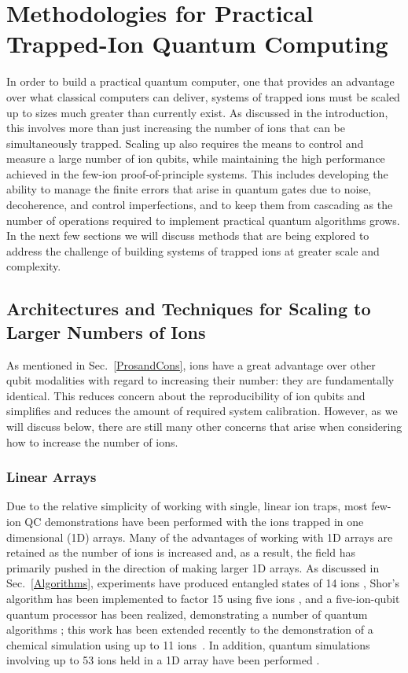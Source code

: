 \documentclass[%
12pt,
 amsmath,amssymb,
]{revtex4-2}
\begin{document}
\section{Methodologies for Practical Trapped-Ion Quantum Computing}
\label{PracticalQC}
In order to build a practical quantum computer, one that provides an advantage over what classical computers can deliver, systems of trapped ions must be scaled up to sizes much greater than currently exist.  As discussed in the introduction, this involves more than just increasing the number of ions that can be simultaneously trapped. Scaling up also requires the means to control and measure a large number of ion qubits, while maintaining the high performance achieved in the few-ion proof-of-principle systems.  This includes developing the ability to manage the finite errors that arise in quantum gates due to noise, decoherence, and control imperfections, and to keep them from cascading as the number of operations required to implement practical quantum algorithms grows.  In the next few sections we will discuss methods that are being explored to address the challenge of building systems of trapped ions at greater scale and complexity.

\subsection{Architectures and Techniques for Scaling to Larger Numbers of Ions}
\label{ScalingMethods}
As mentioned in Sec.~\ref{ProsandCons}, ions have a great advantage over other qubit modalities with regard to increasing their number: they are fundamentally identical.  This reduces concern about the reproducibility of ion qubits and simplifies and reduces the amount of required system calibration.  However, as we will discuss below, there are still many other concerns that arise when considering how to increase the number of ions.
    \subsubsection{Linear Arrays}
    \label{LinearArrays}
Due to the relative simplicity of working with single, linear ion traps, most few-ion QC demonstrations have been performed with the ions trapped in one dimensional (1D) arrays.  Many of the advantages of working with 1D arrays are retained as the number of ions is increased and, as a result, the field has primarily pushed in the direction of making larger 1D arrays. As discussed in Sec.~\ref{Algorithms}, experiments have produced entangled states of 14 ions \cite{Monz14IonEntanglement2011}, Shor's algorithm has been implemented to factor 15 using five ions \cite{MonzScalableShor2016}, and a five-ion-qubit quantum processor has been realized, demonstrating a number of quantum algorithms \cite{Debnath5QubitComp2016,FiggattGroverSearch2017}; this work has been extended recently to the demonstration of a chemical simulation using up to 11 ions~\cite{NamWaterMolecule2019}.  In addition, quantum simulations involving up to 53 ions held in a 1D array have been performed \cite{Zhang53IonSim2017}.
\end{document}
